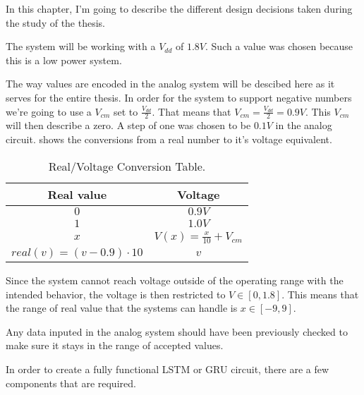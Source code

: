 
\label{cap:design}

In this chapter, I'm going to describe the different design decisions taken during the study of the thesis.

The system will be working with a $V_{dd}$ of $1.8V$. Such a value was chosen because this is a low power system.

The way values are encoded in the analog system will be descibed here as it serves for the entire thesis.
In order for the system to support negative numbers we're going to use a $V_{cm}$ set to $\frac{V_{dd}}{2}$. That means that $V_{cm}=\frac{V_{dd}}{2}=0.9V$. This $V_{cm}$ will then describe a zero. A step of one was chosen to be $0.1V$ in the analog circuit.
 shows the conversions from a real number to it's voltage equivalent.

\begin{table}[H]
  \centering
  \begin{tabular}{|c|c|}
    \hline
    \rowcolor{gray}
    Real value & Voltage \\
    \hline
    $0$ & $0.9V$ \\
    \hline
    $1$ & $1.0V$ \\
    \hline
    $x$ & $V(x)=\frac{x}{10}+V_{cm}$\\
    \hline
    $real(v)=(v-0.9)\cdot 10$ & $v$\\
    \hline
  \end{tabular}
  \caption{Real/Voltage Conversion Table.}
  \label{tab:valConv}
\end{table}

Since the system cannot reach voltage outside of the operating range with the intended behavior, the voltage is then restricted to $V\in [0,1.8]$. This means that the range of real value that the systems can handle is $x\in [-9,9]$.

Any data inputed in the analog system should have been previously checked to make sure it stays in the range of accepted values.

In order to create a fully functional \ac{LSTM} or \ac{GRU} circuit, there are a few components that are required.

